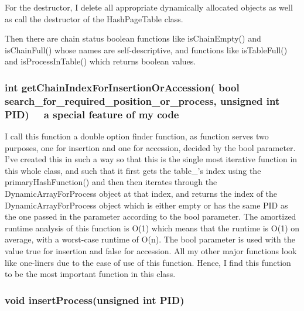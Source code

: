        For the destructor, I delete all appropriate dynamically allocated objects as well as call the destructor of the {\color{draculapurple}HashPageTable} class.
        
        Then there are chain status boolean functions like {\color{draculapurple}isChainEmpty()} and 
        {\color{draculapurple}isChainFull()} whose names are self-descriptive, and functions like 
        {\color{draculapurple}isTableFull()} and {\color{draculapurple}isProcessInTable()} which returns boolean values.

    \subsubsection{{\color{orange}int} {\color{draculapurple}getChainIndexForInsertionOrAccession}( {\color{orange}bool} search\_for\_required\_position\_or\_process, {\color{orange}unsigned int} PID)
    \faStar~~{\color{Awesome}a special feature of my code}~~\faStar}
        I call this function a double option finder function, as function serves two purposes, one for insertion and one for accession, decided by the {\color{orange}bool} parameter. 
        I've created this in such a way so that this is the single most iterative function in this whole class, and such that it 
        first gets the {\color{Turquoise}table\_}'s index using the {\color{draculapurple}primaryHashFunction()} and then then 
        iterates through the {\color{draculapurple}DynamicArrayForProcess} object at that index, and returns the index of the 
        {\color{draculapurple}DynamicArrayForProcess} object which is either empty or has the same {\color{draculapurple}PID} as the one passed in the parameter according to the 
        {\color{orange}bool} parameter. The amortized runtime analysis of this function is {\color{lightblue}O(1)} which means that the runtime is {\color{lightblue}O(1)} on average, with a worst-case runtime of {\color{lightblue}O(n)}.
        The {\color{orange}bool} parameter is used with the value {\color{LightPink}true} for insertion and {\color{LightPink}false} for accession.
        All my other major functions look like {\color{GoldenYellow}one-liners} due to the ease of use of this function. Hence, I find this function to be the most important function in this class.

    \subsubsection{{\color{orange}void} {\color{draculapurple}insertProcess}({\color{orange}unsigned int} PID)}

